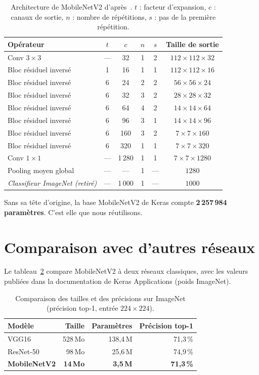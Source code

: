 \begin{table}[H]
\centering
\caption{Architecture de MobileNetV2 d’après~\cite{sandler2018}. $t$ : facteur d’expansion, $c$ : canaux de sortie, $n$ : nombre de répétitions, $s$ : pas de la première répétition.}\label{tab:mnv2}
\small
\begin{tabular}{@{}lccccc@{}}
\toprule
\textbf{Opérateur} & $t$ & $c$ & $n$ & $s$ & \textbf{Taille de sortie} \\
\midrule
Conv $3\times3$ & --- & 32 & 1 & 2 & $112\times112\times32$ \\
Bloc résiduel inversé & 1 & 16 & 1 & 1 & $112\times112\times16$ \\
Bloc résiduel inversé & 6 & 24 & 2 & 2 & $56\times56\times24$ \\
Bloc résiduel inversé & 6 & 32 & 3 & 2 & $28\times28\times32$ \\
Bloc résiduel inversé & 6 & 64 & 4 & 2 & $14\times14\times64$ \\
Bloc résiduel inversé & 6 & 96 & 3 & 1 & $14\times14\times96$ \\
Bloc résiduel inversé & 6 & 160 & 3 & 2 & $7\times7\times160$ \\
Bloc résiduel inversé & 6 & 320 & 1 & 1 & $7\times7\times320$ \\
Conv $1\times1$ & --- & 1\,280 & 1 & 1 & $7\times7\times1280$ \\
\midrule
Pooling moyen global & --- & --- & 1 & --- & $1280$ \\
\textit{Classifieur ImageNet (retiré)} & --- & 1\,000 & 1 & --- & $1000$ \\
\bottomrule
\end{tabular}
\end{table}

Sans sa tête d’origine, la base MobileNetV2 de Keras compte \textbf{2\,257\,984 paramètres}. C’est elle que nous réutilisons.

\section{Comparaison avec d’autres réseaux}

Le tableau~\ref{tab:compare} compare MobileNetV2 à deux réseaux classiques, avec les valeurs publiées dans la documentation de Keras Applications (poids ImageNet).

\begin{table}[H]
\centering
\caption{Comparaison des tailles et des précisions sur ImageNet (précision top-1, entrée $224\times224$).}\label{tab:compare}
\small
\begin{tabular}{@{}lrrr@{}}
\toprule
\textbf{Modèle} & \textbf{Taille} & \textbf{Paramètres} & \textbf{Précision top-1} \\
\midrule
VGG16 & 528\,Mo & 138,4\,M & 71,3\,\% \\
ResNet-50 & 98\,Mo & 25,6\,M & 74,9\,\% \\
\textbf{MobileNetV2} & \textbf{14\,Mo} & \textbf{3,5\,M} & \textbf{71,3\,\%} \\
\bottomrule
\end{tabular}
\end{table}

